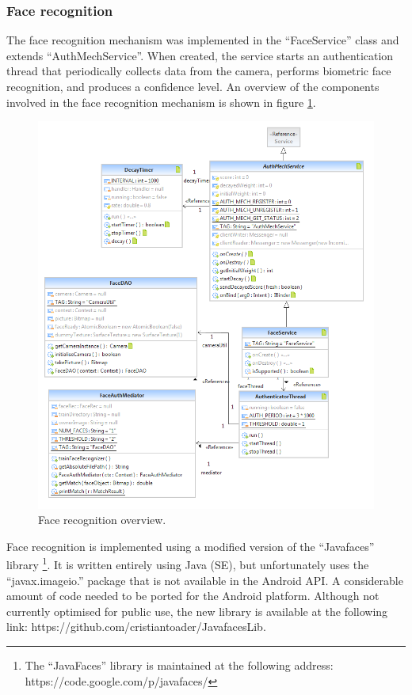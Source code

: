 \subsubsection{Face recognition}
\label{implface}
The face recognition mechanism was implemented in the ``FaceService'' class and extends ``AuthMechService''. When created, the service starts an authentication thread that periodically collects data from the camera, performs biometric face recognition, and produces a confidence level. An overview of the components involved in the face recognition mechanism is shown in figure \ref{fig:face}.
\begin{figure}[h]
    \centering
    \includegraphics[width=\textwidth]{Pictures/face}
    \caption{Face recognition overview.}
    \label{fig:face}
\end{figure}

Face recognition is implemented using a modified version of the ``Javafaces'' library \footnote{The ``JavaFaces'' library is maintained at the following address: https://code.google.com/p/javafaces/}. It is written entirely using Java (SE), but unfortunately uses the ``javax.imageio.'' package that is not available in the Android API. A considerable amount of code needed to be ported for the Android platform. Although not currently optimised for public use, the new library is available at the following link: https://github.com/cristiantoader/JavafacesLib.

